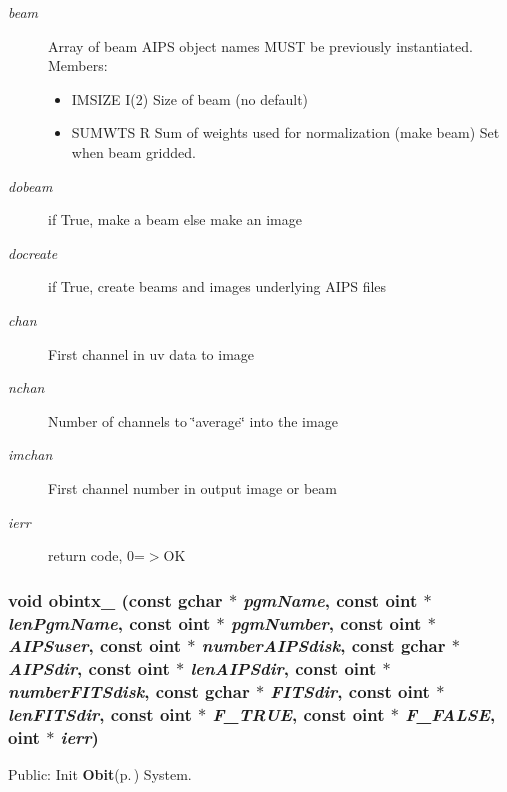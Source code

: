 \begin{Desc}
\begin{description}
\item[{\em beam}]Array of beam AIPS object names MUST be previously instantiated. Members: \begin{itemize}
\item IMSIZE I(2) Size of beam (no default) \item SUMWTS R Sum of weights used for normalization (make beam) Set when beam gridded. \end{itemize}
\item[{\em dobeam}]if True, make a beam else make an image \item[{\em docreate}]if True, create beams and images underlying AIPS files \item[{\em chan}]First channel in uv data to image \item[{\em nchan}]Number of channels to \char`\"{}average\char`\"{} into the image \item[{\em imchan}]First channel number in output image or beam \item[{\em ierr}]return code, 0=$>$OK \end{description}
\end{Desc}
\subsubsection{\setlength{\rightskip}{0pt plus 5cm}void obintx\_\- (const gchar $\ast$ {\em pgm\-Name}, const {\bf oint} $\ast$ {\em len\-Pgm\-Name}, const {\bf oint} $\ast$ {\em pgm\-Number}, const {\bf oint} $\ast$ {\em AIPSuser}, const {\bf oint} $\ast$ {\em number\-AIPSdisk}, const gchar $\ast$ {\em AIPSdir}, const {\bf oint} $\ast$ {\em len\-AIPSdir}, const {\bf oint} $\ast$ {\em number\-FITSdisk}, const gchar $\ast$ {\em FITSdir}, const {\bf oint} $\ast$ {\em len\-FITSdir}, const {\bf oint} $\ast$ {\em F\_\-TRUE}, const {\bf oint} $\ast$ {\em F\_\-FALSE}, {\bf oint} $\ast$ {\em ierr})}\label{ObitAIPSFortran_8h_a0}


Public: Init {\bf Obit}{\rm (p.\,\pageref{structObit})} System. 

